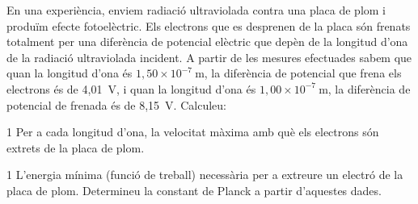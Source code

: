 En una experiència, enviem radiació ultraviolada contra una placa de plom i produïm efecte fotoelèctric. Els electrons que es desprenen de la placa són frenats totalment per una diferència de potencial elèctric que depèn de la longitud d'ona de la radiació ultraviolada incident. A partir de les mesures efectuades sabem que quan la longitud d'ona és $1,50\times 10^{-7}\ \mathrm{m}$, la diferència de potencial que frena els electrons és de 4,01~V, i quan la longitud d'ona és $1,00\times 10^{-7}\ \mathrm{m}$, la diferència de potencial de frenada és de 8,15~V. Calculeu:

\begin{apartat}{1}
Per a cada longitud d'ona, la velocitat màxima amb què els electrons són extrets de la placa de plom.
\end{apartat}

\begin{apartat}{1}
L'energia mínima (funció de treball) necessària per a extreure un electró de la placa de plom. Determineu la constant de Planck a partir d'aquestes dades.
\end{apartat}

